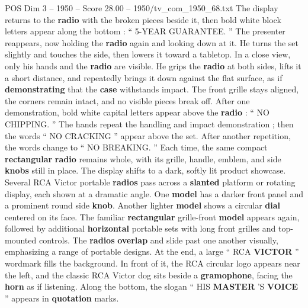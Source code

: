 \begin{textsample}{POS Dim 3 – 1950 – Score 28.00 – 1950/tv\_com\_1950\_68.txt}
The display returns to the \textbf{radio} with the broken pieces beside it, then bold white block letters appear along the bottom : “ 5-YEAR GUARANTEE. ” The presenter reappears, now holding the \textbf{radio} again and looking down at it.
He turns the set slightly and touches the side, then lowers it toward a tabletop.
In a close view, only his hands and the \textbf{radio} are visible.
He grips the \textbf{radio} at both sides, lifts it a short distance, and repeatedly brings it down against the flat surface, as if \textbf{demonstrating} that the \textbf{case} withstands impact.
The front grille stays aligned, the corners remain intact, and no visible pieces break off.
After one demonstration, bold white capital letters appear above the \textbf{radio} : “ NO CHIPPING. ” The hands repeat the handling and impact demonstration ; then the words “ NO CRACKING ” appear above the set.
After another repetition, the words change to “ NO BREAKING. ” Each time, the same compact \textbf{rectangular} \textbf{radio} remains whole, with its grille, handle, emblem, and side \textbf{knobs} still in place.
The display shifts to a dark, softly lit product showcase.
Several RCA Victor portable \textbf{radios} pass across a \textbf{slanted} platform or rotating display, each shown at a dramatic angle.
One \textbf{model} has a darker front panel and a prominent round side \textbf{knob}.
Another lighter \textbf{model} shows a circular \textbf{dial} centered on its face.
The familiar \textbf{rectangular} grille-front \textbf{model} appears again, followed by additional \textbf{horizontal} portable sets with long front grilles and top-mounted controls.
The \textbf{radios} \textbf{overlap} and slide past one another visually, emphasizing a range of portable designs.
At the end, a large “ RCA \textbf{VICTOR} ” wordmark fills the background.
In front of it, the RCA circular logo appears near the left, and the classic RCA Victor dog sits beside a \textbf{gramophone}, facing the \textbf{horn} as if listening.
Along the bottom, the slogan “ HIS \textbf{MASTER} ’S \textbf{VOICE} ” appears in \textbf{quotation} marks.

\end{textsample}
